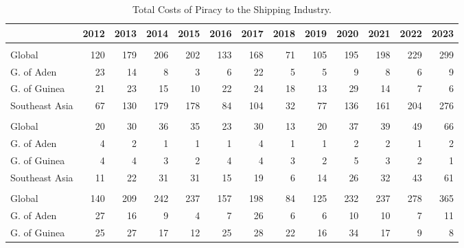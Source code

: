 \begin{table}
\centering
\caption{\label{tab:agg_cost}Total Costs of Piracy to the Shipping Industry.}
\centering
\begin{adjustbox}{width = .9\textwidth}
\begin{threeparttable}
\begin{tabular}[t]{lrrrrrrrrrrrr}
\toprule
 & 2012 & 2013 & 2014 & 2015 & 2016 & 2017 & 2018 & 2019 & 2020 & 2021 & 2022 & 2023\\
\midrule
\addlinespace[0.3em]
\multicolumn{13}{l}{Fuel (millions of US\$)}\\
\hspace{1em}Global & 120 & 179 & 206 & 202 & 133 & 168 & 71 & 105 & 195 & 198 & 229 & 299\\
\hspace{1em}G. of Aden & 23 & 14 & 8 & 3 & 6 & 22 & 5 & 5 & 9 & 8 & 6 & 9\\
\hspace{1em}G. of Guinea & 21 & 23 & 15 & 10 & 22 & 24 & 18 & 13 & 29 & 14 & 7 & 6\\
\hspace{1em}Southeast Asia & 67 & 130 & 179 & 178 & 84 & 104 & 32 & 77 & 136 & 161 & 204 & 276\\
\addlinespace[0.3em]
\multicolumn{13}{l}{Labor (millions of US\$)}\\
\hspace{1em}Global & 20 & 30 & 36 & 35 & 23 & 30 & 13 & 20 & 37 & 39 & 49 & 66\\
\hspace{1em}G. of Aden & 4 & 2 & 1 & 1 & 1 & 4 & 1 & 1 & 2 & 2 & 1 & 2\\
\hspace{1em}G. of Guinea & 4 & 4 & 3 & 2 & 4 & 4 & 3 & 2 & 5 & 3 & 2 & 1\\
\hspace{1em}Southeast Asia & 11 & 22 & 31 & 31 & 15 & 19 & 6 & 14 & 26 & 32 & 43 & 61\\
\addlinespace[0.3em]
\multicolumn{13}{l}{Total (millions of US\$)}\\
\hspace{1em}Global & 140 & 209 & 242 & 237 & 157 & 198 & 84 & 125 & 232 & 237 & 278 & 365\\
\hspace{1em}G. of Aden & 27 & 16 & 9 & 4 & 7 & 26 & 6 & 6 & 10 & 10 & 7 & 11\\
\hspace{1em}G. of Guinea & 25 & 27 & 17 & 12 & 25 & 28 & 22 & 16 & 34 & 17 & 9 & 8\\

\end{tabular}
\end{threeparttable}
\end{adjustbox}
\end{table}
